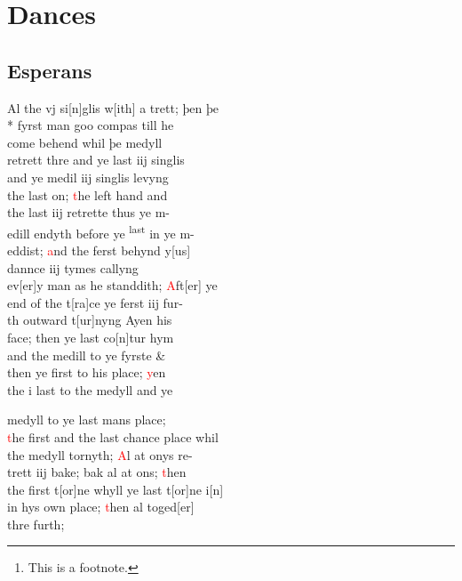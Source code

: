 \documentclass[12pt,letter]{article} %
\newcommand{\red}[1]{\textcolor{red}{#1}}
\newcommand{\srcpg}[1]{
    \noindent{
        \color{Gray}{\rule[0.5ex]{\linewidth}{1pt}~#1} 
    
    }
}
\begin{document}
    \title{\rmfamily\normalfont{}}
    \author{}
    \date{} %
    
    \maketitle
    
    \begin{abstract}
        \noindent\lipsum[1] Just a test.\footnote{This is a footnote.}
    \end{abstract}
       
    \tableofcontents
\newpage

    \section{Dances}
    \reversemarginpar
    \subsection{Esperans} \raggedright 
\srcpg{54}    
 Al the vj si{[}n{]}glis w{[}ith{]} a trett; þen þe \\* 
fyrst man goo compas till he \\ 
come behend whil þe medyll \\ 
retrett thre and ye last iij singlis \\ 
and ye medil iij singlis levyng\\ 
the last on; \red{t}he left hand and \\
the last iij retrette thus ye m-\\
edill endyth before ye \textsuperscript{last} in ye m-\\
eddist; \red{a}nd the ferst behynd y{[}us{]} \\ 
dannce iij tymes callyng\\ 
ev{[}er{]}y man as he standdith; \red{A}ft{[}er{]} ye\\
end of the t{[}ra{]}ce ye ferst iij fur-\\
th outward t{[}ur{]}nyng Ayen his \\ 
face; then ye  last co{[}n{]}tur hym \\ 
and the medill to ye fyrste \& \\
then ye first to his place; \red{y}en \\ 
the i last to the medyll and ye  
\srcpg{55}
medyll to ye last mans  place; \\ 
\red{t}he first and the last chance place whil \\ 
the medyll tornyth; \red{A}l at onys re-\\
trett iij bake; bak al  at ons; \red{t}hen \\ 
the first t{[}or{]}ne whyll ye last t{[}or{]}ne i{[}n{]} \\ 
in hys own place; \red{t}hen al toged{[}er{]}\\ 
thre furth;
\end{document}
